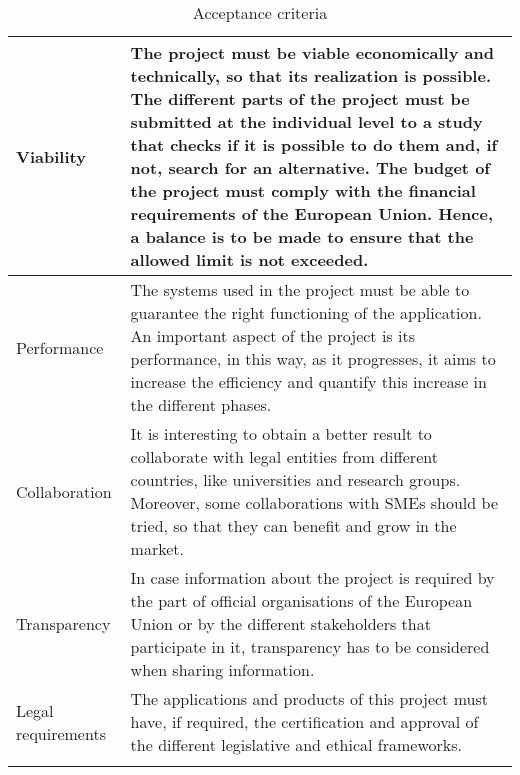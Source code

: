 \begin{longtable}[H]{ p{4cm} p{10cm} }
	\hline
	
	Viability & The project must be viable economically and technically, so that its realization is possible. \newline
	The different parts of the project must be submitted at the individual level to a study that checks if it is possible to do them and, if not, search for an alternative. \newline
	The budget of the project must comply with the financial requirements of the European Union. Hence, a balance is to be made to ensure that the allowed limit is not exceeded. \\
	
	\hline
	
	Performance & The systems used in the project must be able to guarantee the right functioning of the application. An important aspect of the project is its performance, in this way, as it progresses, it aims to increase the efficiency and quantify this increase in the different phases. \\
	
	\hline
	
	Collaboration & It is interesting to obtain a better result to collaborate with legal entities from different countries, like universities and research groups. Moreover, some collaborations with SMEs should be tried, so that they can benefit and grow in the market.	\\
	
	\hline
	
	Transparency & In case information about the project is required by the part of official organisations of the European Union or by the different stakeholders that participate in it, transparency has to be considered when sharing information. \\
	
	\hline
	
	Legal requirements & The applications and products of this project must have, if required, the certification and approval of the different legislative and ethical frameworks. \\
	
	\bottomrule[2pt]
	
	\caption{Acceptance criteria}
\end{longtable}